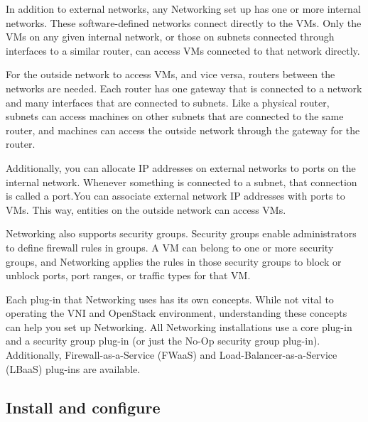    \par In addition to external networks, any Networking set up has one or more internal networks. These software-defined networks connect directly to the VMs. Only the VMs on any given internal network, or those on subnets connected through interfaces to a similar router, can access VMs connected to that network directly.
    
    \par For the outside network to access VMs, and vice versa, routers between the networks are needed. Each router has one gateway that is connected to a network and many interfaces that are connected to subnets. Like a physical router, subnets can access machines on other subnets that are connected to the same router, and machines can access the outside network through the gateway for the router.
    
    \par Additionally, you can allocate IP addresses on external networks to ports on the internal network. Whenever something is connected to a subnet, that connection is called a port.You can associate external network IP addresses with ports to VMs. This way, entities on the outside network can access VMs.
    
    \par Networking also supports security groups. Security groups enable administrators to define firewall rules in groups. A VM can belong to one or more security groups, and Networking applies the rules in those security groups to block or unblock ports, port ranges, or traffic types for that VM.
    
    \par Each plug-in that Networking uses has its own concepts. While not vital to operating the VNI and OpenStack environment, understanding these concepts can help you set up Networking. All Networking installations use a core plug-in and a security group plug-in (or just the No-Op security group plug-in). Additionally, Firewall-as-a-Service (FWaaS) and Load-Balancer-as-a-Service (LBaaS) plug-ins are available.

    \subsection{Install and configure}
    
